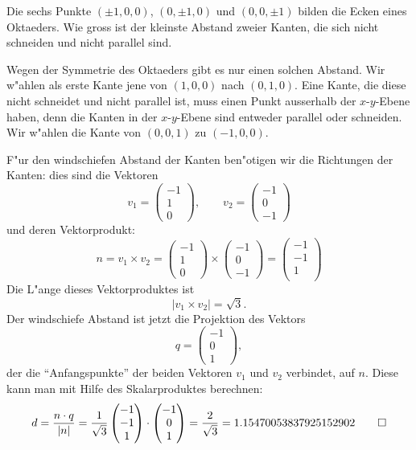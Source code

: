 Die sechs Punkte $(\pm 1,0,0)$, $(0,\pm1,0)$ und $(0,0,\pm1)$ bilden
die Ecken eines Oktaeders.
Wie gross ist der kleinste Abstand zweier Kanten, die sich
nicht schneiden und nicht parallel sind.

\begin{loesung}
Wegen der Symmetrie des Oktaeders gibt es nur einen solchen Abstand.
Wir w"ahlen als erste Kante jene von $(1,0,0)$ nach $(0,1,0)$. Eine
Kante, die diese nicht schneidet und nicht parallel ist, muss einen
Punkt ausserhalb der $x$-$y$-Ebene haben, denn die Kanten in der
$x$-$y$-Ebene sind entweder parallel oder schneiden. Wir w"ahlen die
Kante von $(0,0,1)$ zu $(-1,0,0)$.

F"ur den windschiefen Abstand der Kanten ben"otigen wir die Richtungen
der Kanten: dies sind die Vektoren
\[
v_1=\begin{pmatrix}
-1\\1\\0
\end{pmatrix}
,\qquad
v_2=\begin{pmatrix}
-1\\0\\-1
\end{pmatrix}
\]
und deren Vektorprodukt:
\[
n=v_1\times v_2
=
\begin{pmatrix}
-1\\1\\0
\end{pmatrix}
\times
\begin{pmatrix}
-1\\0\\-1
\end{pmatrix}
=
\begin{pmatrix}
-1\\
-1\\
1\\
\end{pmatrix}
\]
Die L"ange  dieses Vektorproduktes ist
\[
|v_1\times v_2|=\sqrt{3}.
\]
Der windschiefe Abstand ist jetzt die Projektion des Vektors
\[
q=\begin{pmatrix}
-1\\0\\1
\end{pmatrix},
\]
der die ``Anfangspunkte''  der beiden Vektoren $v_1$ und $v_2$
verbindet, auf $n$. Diese kann man mit Hilfe des Skalarproduktes
berechnen:
\[
d=\frac{n\cdot q}{|n|}=
\frac1{\sqrt{3}} \begin{pmatrix}-1\\-1\\1\end{pmatrix}\cdot\begin{pmatrix}
-1\\0\\1
\end{pmatrix}
=\frac2{\sqrt{3}}
=1.15470053837925152902
\qedhere
\]
\end{loesung}

